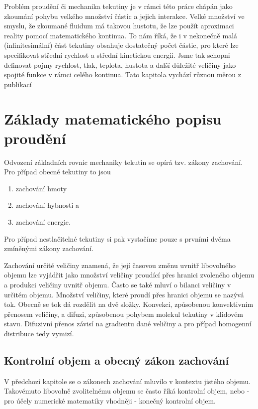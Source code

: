 
Problém proudění či mechanika tekutiny je v rámci této práce chápán jako zkoumání pohybu velkého množství částic a jejich interakce. Velké množství ve smyslu, že zkoumané fluidum má takovou hustotu, že lze použít aproximaci reality pomocí matematického kontinua. To nám říká, že i v nekonečně malá (infinitesimální) část tekutiny obsahuje dostatečný počet částic, pro které lze specifikovat střední rychlost a střední kinetickou energii. Jsme tak schopni definovat pojmy rychlost, tlak, teplota, hustota a další důležité veličiny jako spojité funkce v rámci celého kontinua. Tato kapitola vychází různou měrou z publikací \cite{blazek2015computational, dvorak1987vnitrniaerodynamika, hirsch2007numerical, shapiro1953dynamics, furst2020mko2}

\section{Základy matematického popisu proudění} \label{sec:zaklady_popisu}

Odvození základních rovnic mechaniky tekutin se opírá tzv. zákony zachování. Pro případ obecné tekutiny to jsou
\begin{enumerate}
	\item zachování hmoty
	\item zachování hybnosti a
	\item zachování energie.
\end{enumerate}
Pro případ nestlačitelné tekutiny si pak vystačíme pouze s prvními dvěma zmíněnými zákony zachování.

Zachování určité veličiny znamená, že její časovou změnu uvnitř libovolného objemu lze vyjádřit jako množství veličiny proudící přes hranici zvoleného objemu a produkci veličiny uvnitř objemu. Často se také mluví o bilanci veličiny v určitém objemu. Množství veličiny, které proudí přes hranici objemu se nazývá tok. Obecně se tok dá rozdělit na dvě složky. Konvekci, způsobenou konvektivním přenosem veličiny, a difuzi, způsobenou pohybem molekul tekutiny v klidovém stavu. Difuzivní přenos závisí na gradientu dané veličiny a pro případ homogenní distribuce tedy vymizí.

\subsection{Kontrolní objem a obecný zákon zachování}\label{sec:kontrolni_objem}
V předchozí kapitole se o zákonech zachování mluvilo v kontextu jistého objemu. Takovémuto libovolně zvolitelnému objemu se často říká kontrolní objem, nebo - pro účely numerické matematiky vhodněji - konečný kontrolní objem.

